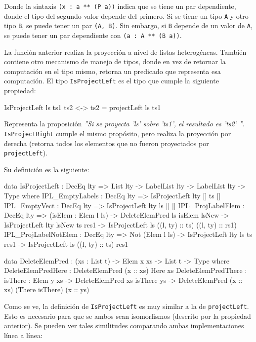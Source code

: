 Donde la sintaxis \texttt{(x : a ** (P a))} indica que se tiene un par dependiente, donde el tipo del segundo valor depende del primero. Si se tiene un tipo \texttt{A} y otro tipo \texttt{B}, se puede tener un par \texttt{(A, B)}. Sin embargo, si \texttt{B} depende de un valor de \texttt{A}, se puede tener un par dependiente con \texttt{(a : A ** (B a))}.

La función anterior realiza la proyección a nivel de listas heterogéneas. También contiene otro mecanismo de manejo de tipos, donde en vez de retornar la computación en el tipo mismo, retorna un predicado que representa esa computación. El tipo \texttt{IsProjectLeft} es el tipo que cumple la siguiente propiedad:

\begin{code}
IsProjectLeft ls ts1 ts2 <-> ts2 = projectLeft ls ts1
\end{code}

Representa la proposición \textit{''Si se proyecta 'ls' sobre 'ts1', el resultado es 'ts2' ''}. \texttt{IsProjectRight} cumple el mismo propósito, pero realiza la proyección por derecha (retorna todos los elementos que no fueron proyectados por \texttt{projectLeft}).

Su definición es la siguiente:

\begin{code}
data IsProjectLeft : DecEq lty => List lty -> LabelList lty ->
  LabelList lty -> Type where
  IPL_EmptyLabels : DecEq lty => IsProjectLeft {lty} [] ts []
  IPL_EmptyVect : DecEq lty => IsProjectLeft {lty} ls [] []
  IPL_ProjLabelElem : DecEq lty => (isElem : Elem l ls) ->
    DeleteElemPred ls isElem lsNew ->
    IsProjectLeft {lty} lsNew ts res1 ->
    IsProjectLeft ls ((l, ty) :: ts) ((l, ty) :: rs1)
  IPL_ProjLabelNotElem : DecEq lty => Not (Elem l ls) ->
    IsProjectLeft {lty} ls ts res1 ->
    IsProjectLeft ls ((l, ty) :: ts) res1

data DeleteElemPred : (xs : List t) -> Elem x xs ->
  List t -> Type where
  DeleteElemPredHere : DeleteElemPred (x :: xs) Here xs
  DeleteElemPredThere : {isThere : Elem y xs} ->
    DeleteElemPred xs isThere ys ->
    DeleteElemPred (x :: xs) (There isThere) (x :: ys)
\end{code}

Como se ve, la definición de \texttt{IsProjectLeft} es muy similar a la de \texttt{projectLeft}. Esto es necesario para que se ambos sean isomorfismos (descrito por la propiedad anterior). Se pueden ver tales similitudes comparando ambas implementaciones línea a línea:


